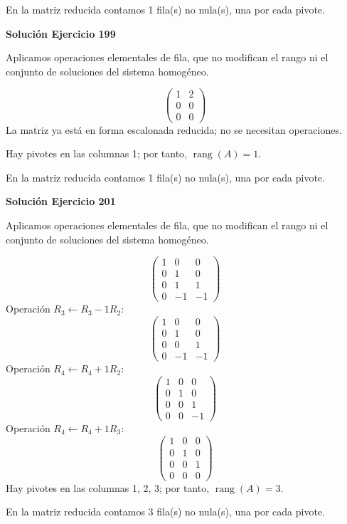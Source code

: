 \documentclass[12pt]{article}
\theoremstyle{remark}
\newcommand{\rang}{\operatorname{rang}}
\begin{document}
En la matriz reducida contamos 1 fila(s) no nula(s), una por cada pivote.


\par\bigskip\noindent\textbf{Solución Ejercicio 199}\par\nobreak
Aplicamos operaciones elementales de fila, que no modifican el rango ni el conjunto de soluciones del sistema homogéneo.

\[
\begin{pmatrix}1&2\\0&0\\0&0\end{pmatrix}
\]
La matriz ya está en forma escalonada reducida; no se necesitan operaciones.

Hay pivotes en las columnas 1; por tanto, $\boxed{\rang(A)=1}$.

En la matriz reducida contamos 1 fila(s) no nula(s), una por cada pivote.


\par\bigskip\noindent\textbf{Solución Ejercicio 201}\par\nobreak
Aplicamos operaciones elementales de fila, que no modifican el rango ni el conjunto de soluciones del sistema homogéneo.

\[
\begin{pmatrix}1&0&0\\0&1&0\\0&1&1\\0&-1&-1\end{pmatrix}
\]
Operación $R_{3}\leftarrow R_{3}-1R_{2}$:
\[
\begin{pmatrix}1&0&0\\0&1&0\\0&0&1\\0&-1&-1\end{pmatrix}
\]
Operación $R_{4}\leftarrow R_{4}+1R_{2}$:
\[
\begin{pmatrix}1&0&0\\0&1&0\\0&0&1\\0&0&-1\end{pmatrix}
\]
Operación $R_{4}\leftarrow R_{4}+1R_{3}$:
\[
\begin{pmatrix}1&0&0\\0&1&0\\0&0&1\\0&0&0\end{pmatrix}
\]
Hay pivotes en las columnas 1, 2, 3; por tanto, $\boxed{\rang(A)=3}$.

En la matriz reducida contamos 3 fila(s) no nula(s), una por cada pivote.
\end{document}
